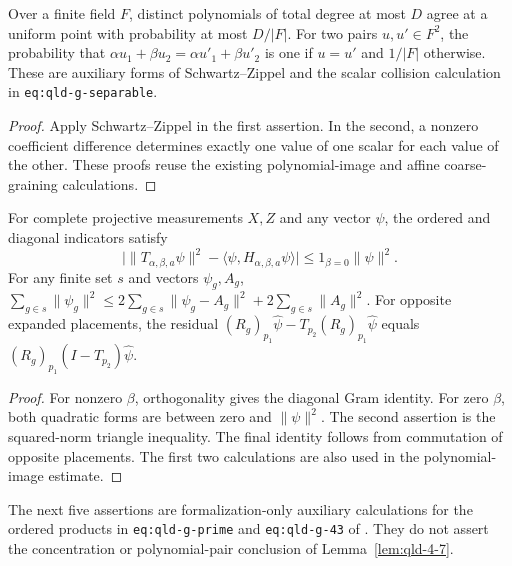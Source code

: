 \begin{lemma}
\label{lem:qld-fiber-collisions}
\leanok
Over a finite field $F$, distinct polynomials of total degree at most $D$
agree at a uniform point with probability at most $D/|F|$.
For two pairs $u,u'\in F^2$, the probability that
$\alpha u_1+\beta u_2=\alpha u'_1+\beta u'_2$ is one if $u=u'$ and
$1/|F|$ otherwise. These are auxiliary forms of Schwartz--Zippel and
the scalar collision calculation in \texttt{eq:qld-g-separable}.
\end{lemma}
\begin{proof}
\leanok
Apply Schwartz--Zippel in the first assertion. In the second, a nonzero
coefficient difference determines exactly one value of one scalar for
each value of the other. These proofs reuse the existing polynomial-image
and affine coarse-graining calculations.
\end{proof}

\begin{lemma}
\label{lem:qld-fiber-norm-comparisons}
\leanok
For complete projective measurements $X,Z$ and any vector $\psi$, the
ordered and diagonal indicators satisfy
\[
 \bigl|\|T_{\alpha,\beta,a}\psi\|^2
       -\langle\psi,H_{\alpha,\beta,a}\psi\rangle\bigr|
 \leq 1_{\beta=0}\|\psi\|^2.
\]
For any finite set $s$ and vectors $\psi_g,A_g$,
$\sum_{g\in s}\|\psi_g\|^2\leq
2\sum_{g\in s}\|\psi_g-A_g\|^2+2\sum_{g\in s}\|A_g\|^2$.
For opposite expanded placements, the residual
$(R_g)_{p_1}\hat\psi-T_{p_2}(R_g)_{p_1}\hat\psi$
equals $(R_g)_{p_1}(I-T_{p_2})\hat\psi$.
\end{lemma}
\begin{proof}
\leanok
{}
For nonzero $\beta$, orthogonality gives the diagonal Gram identity.
For zero $\beta$, both quadratic forms are between zero and $\|\psi\|^2$.
The second assertion is the squared-norm triangle inequality.
The final identity follows from commutation of opposite placements.
The first two calculations are also used in the polynomial-image estimate.
\end{proof}

The next five assertions are formalization-only auxiliary calculations for
the ordered products in \texttt{eq:qld-g-prime} and
\texttt{eq:qld-g-43} of \cite{Ji2020MIPStar}. They do not assert the
concentration or polynomial-pair conclusion of Lemma~\ref{lem:qld-4-7}.

